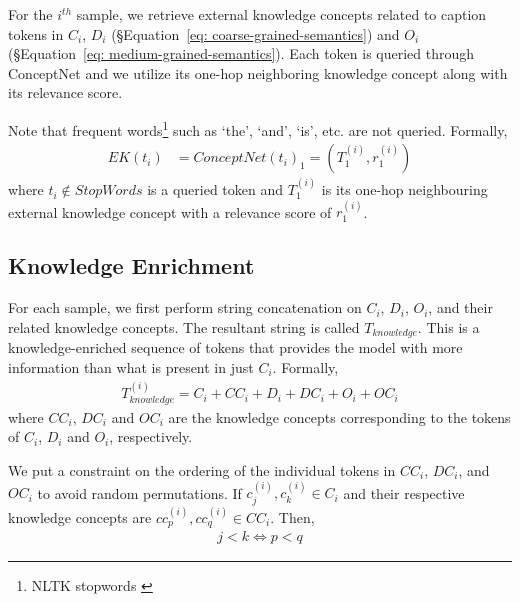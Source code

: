 For the $i^{th}$ sample, we retrieve external knowledge concepts related to caption tokens in $C_i$, $D_i$ (\S Equation~\ref{eq: coarse-grained-semantics}) and $O_i$ (\S Equation~\ref{eq: medium-grained-semantics}). Each token is queried through ConceptNet and we utilize its one-hop neighboring knowledge concept along with its relevance score. 

Note that frequent words\footnote{NLTK stopwords \cite{nltk}} such as `the', `and', `is', etc. are not queried. Formally, 
\begin{equation}
    \label{eq: external-knowledge-retrieval}
    \begin{aligned}
        EK(t_i) & = ConceptNet(t_i)_1 = (T_1^{(i)}, r_1^{(i)})
    \end{aligned}
\end{equation}
where $t_i \notin StopWords$ is a queried token and $T_1^{(i)}$ is its one-hop neighbouring external knowledge concept with a relevance score of $r_1^{(i)}$.

\subsection{Knowledge Enrichment}
\label{sec:knowledge-enrichment}
For each sample, we first 
perform string concatenation on $C_i$, $D_i$, $O_i$, and their related knowledge concepts. The resultant string is called $T_{knowledge}$. This is a knowledge-enriched sequence of tokens that provides the model with more information than what is present in just $C_i$. Formally,
\begin{equation}
    \label{eq: t-knowledge}
    \begin{aligned}
        T_{knowledge}^{(i)} = C_i + CC_i + D_i + DC_i + O_i + OC_i
    \end{aligned}
\end{equation}
where $CC_i$, $DC_i$ and $OC_i$ are the knowledge concepts corresponding to the tokens of $C_i$, $D_i$ and $O_i$, respectively.

We put a constraint on the ordering of the individual tokens in $CC_i$, $DC_i$, and $OC_i$ to avoid random permutations. If $c_j^{(i)}, c_k^{(i)} \in C_i$ and their respective knowledge concepts are $cc_p^{(i)}, cc_q^{(i)} \in CC_i$. Then,
\begin{equation}
    \label{eq: knowledge-tokens-constraints}
    \begin{aligned}
        j < k \iff p < q
    \end{aligned}
\end{equation}

